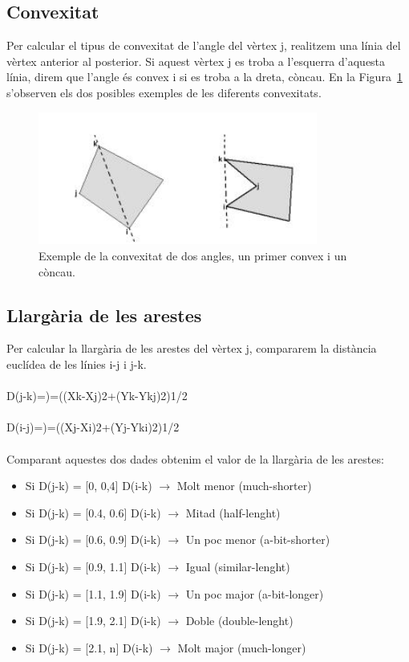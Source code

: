 \documentclass{article}
\begin{document}
\subsection{Convexitat}
Per calcular el tipus de convexitat de l’angle del vèrtex j, realitzem una línia del vèrtex anterior al posterior.
Si aquest vèrtex j es troba a l'esquerra d'aquesta línia, direm que l'angle és convex i si es troba a la dreta, còncau.
En la Figura~\ref{fig:convex} s'observen els dos posibles exemples de les diferents convexitats.

\begin{figure}[h]
\centering
\includegraphics[width=260pt]{images/convex.jpeg}
\caption {Exemple de la convexitat de dos angles, un primer convex i un còncau.}
\label {fig:convex}
\end{figure}

\subsection{Llargària de les arestes}
Per calcular la llargària de les arestes del vèrtex  j, compararem la distància euclídea de les línies i-j i j-k.
\\
\\
D(j-k)=)=((Xk-Xj)2+(Yk-Ykj)2)1/2
\\
\\
D(i-j)=)=((Xj-Xi)2+(Yj-Yki)2)1/2
\\
\\
Comparant aquestes dos dades obtenim el valor de la llargària de les arestes:
\begin{itemize}
\item Si D(j-k) = [0, 0,4]   D(i-k) $\rightarrow$  Molt menor (much-shorter)
\item Si D(j-k) = [0.4, 0.6] D(i-k) $\rightarrow$  Mitad (half-lenght)
\item Si D(j-k) = [0.6, 0.9] D(i-k) $\rightarrow$  Un poc menor (a-bit-shorter)
\item Si D(j-k) = [0.9, 1.1] D(i-k) $\rightarrow$  Igual (similar-lenght)
\item Si D(j-k) = [1.1, 1.9] D(i-k) $\rightarrow$  Un poc major (a-bit-longer)
\item Si D(j-k) = [1.9, 2.1] D(i-k) $\rightarrow$  Doble (double-lenght)
\item Si D(j-k) = [2.1, n]   D(i-k) $\rightarrow$  Molt major (much-longer)
\end{itemize}
\end{document}
